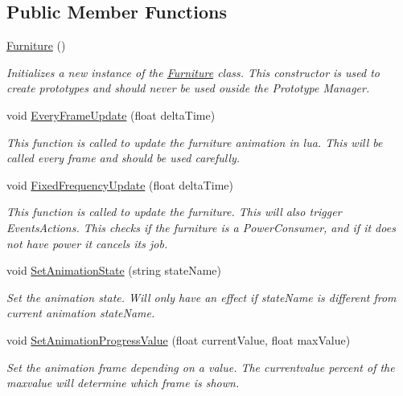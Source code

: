 \subsection*{Public Member Functions}
\begin{DoxyCompactItemize}
\item 
\hyperlink{class_furniture_a126d329d48ac7f41a8567d400c0a2598}{Furniture} ()
\begin{DoxyCompactList}\small\item\em Initializes a new instance of the \hyperlink{class_furniture}{Furniture} class. This constructor is used to create prototypes and should never be used ouside the Prototype Manager. \end{DoxyCompactList}\item 
void \hyperlink{class_furniture_ad44ee227637d74afa5636c9610ec8dbc}{Every\+Frame\+Update} (float delta\+Time)
\begin{DoxyCompactList}\small\item\em This function is called to update the furniture animation in lua. This will be called every frame and should be used carefully. \end{DoxyCompactList}\item 
void \hyperlink{class_furniture_af86f663d0e91858a85de20149a0188e5}{Fixed\+Frequency\+Update} (float delta\+Time)
\begin{DoxyCompactList}\small\item\em This function is called to update the furniture. This will also trigger Events\+Actions. This checks if the furniture is a Power\+Consumer, and if it does not have power it cancels its job. \end{DoxyCompactList}\item 
void \hyperlink{class_furniture_a3210d7837b7568a37f3f3f2f70c58d98}{Set\+Animation\+State} (string state\+Name)
\begin{DoxyCompactList}\small\item\em Set the animation state. Will only have an effect if state\+Name is different from current animation state\+Name. \end{DoxyCompactList}\item 
void \hyperlink{class_furniture_a3cd1d79bc68f11708bca068e684385fd}{Set\+Animation\+Progress\+Value} (float current\+Value, float max\+Value)
\begin{DoxyCompactList}\small\item\em Set the animation frame depending on a value. The currentvalue percent of the maxvalue will determine which frame is shown. \end{DoxyCompactList}\item 

\end{DoxyCompactItemize}
